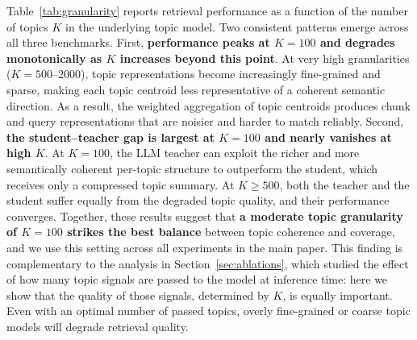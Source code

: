\documentclass{llmxive}
\begin{document}
Table~\ref{tab:granularity} reports retrieval performance as a function of the number of topics $K$ in the underlying topic model. Two consistent patterns emerge across all three benchmarks. First, \textbf{performance peaks at $K=100$ and degrades monotonically as $K$ increases beyond this point}. At very high granularities ($K=500$--$2000$), topic representations become increasingly fine-grained and sparse, making each topic centroid less representative of a coherent semantic direction. As a result, the weighted aggregation of topic centroids produces chunk and query representations that are noisier and harder to match reliably. Second, \textbf{the student--teacher gap is largest at $K=100$ and nearly vanishes at high $K$}. At $K=100$, the LLM teacher can exploit the richer and more semantically coherent per-topic structure to outperform the student, which receives only a compressed topic summary. At $K \geq 500$, both the teacher and the student suffer equally from the degraded topic quality, and their performance converges. Together, these results suggest that \textbf{a moderate topic granularity of $K=100$ strikes the best balance} between topic coherence and coverage, and we use this setting across all experiments in the main paper. This finding is complementary to the analysis in Section~\ref{sec:ablations}, which studied the effect of how many topic signals are passed to the model at inference time: here we show that the quality of those signals, determined by $K$, is equally important. Even with an optimal number of passed topics, overly fine-grained or coarse topic models will degrade retrieval quality.
\end{document}
